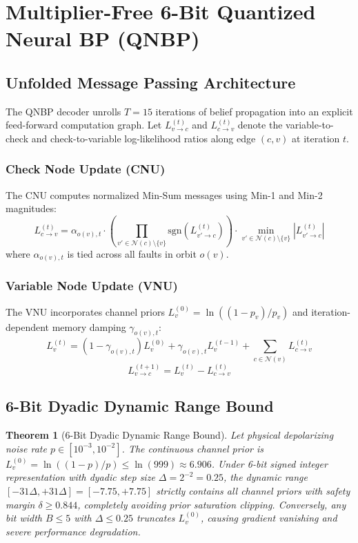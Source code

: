 \documentclass[journal]{IEEEtran}
\newtheorem{theorem}{Theorem}
\begin{document}
\section{Multiplier-Free 6-Bit Quantized Neural BP (QNBP)}

\subsection{Unfolded Message Passing Architecture}
The QNBP decoder unrolls $T=15$ iterations of belief propagation into an explicit feed-forward computation graph. Let $L_{v \to c}^{(t)}$ and $L_{c \to v}^{(t)}$ denote the variable-to-check and check-to-variable log-likelihood ratios along edge $(c, v)$ at iteration $t$.

\subsubsection{Check Node Update (CNU)}
The CNU computes normalized Min-Sum messages using Min-1 and Min-2 magnitudes:
\begin{equation}
    L_{c \to v}^{(t)} = \alpha_{o(v), t} \cdot \left( \prod_{v' \in \mathcal{N}(c) \setminus \{v\}} \text{sgn}(L_{v' \to c}^{(t)}) \right) \cdot \min_{v' \in \mathcal{N}(c) \setminus \{v\}} |L_{v' \to c}^{(t)}|
\end{equation}
where $\alpha_{o(v), t}$ is tied across all faults in orbit $o(v)$.

\subsubsection{Variable Node Update (VNU)}
The VNU incorporates channel priors $L_v^{(0)} = \ln((1-p_v)/p_v)$ and iteration-dependent memory damping $\gamma_{o(v), t}$:
\begin{equation}
    L_v^{(t)} = (1 - \gamma_{o(v), t}) L_v^{(0)} + \gamma_{o(v), t} L_v^{(t-1)} + \sum_{c \in \mathcal{N}(v)} L_{c \to v}^{(t)}
\end{equation}
\begin{equation}
    L_{v \to c}^{(t+1)} = L_v^{(t)} - L_{c \to v}^{(t)}
\end{equation}

\subsection{6-Bit Dyadic Dynamic Range Bound}
\begin{theorem}[6-Bit Dyadic Dynamic Range Bound]
Let physical depolarizing noise rate $p \in [10^{-3}, 10^{-2}]$. The continuous channel prior is $L_v^{(0)} = \ln((1-p)/p) \le \ln(999) \approx 6.906$. Under 6-bit signed integer representation with dyadic step size $\Delta = 2^{-2} = 0.25$, the dynamic range $[-31\Delta, +31\Delta] = [-7.75, +7.75]$ strictly contains all channel priors with safety margin $\delta \ge 0.844$, completely avoiding prior saturation clipping. Conversely, any bit width $B \le 5$ with $\Delta \le 0.25$ truncates $L_v^{(0)}$, causing gradient vanishing and severe performance degradation.
\end{theorem}
\end{document}
